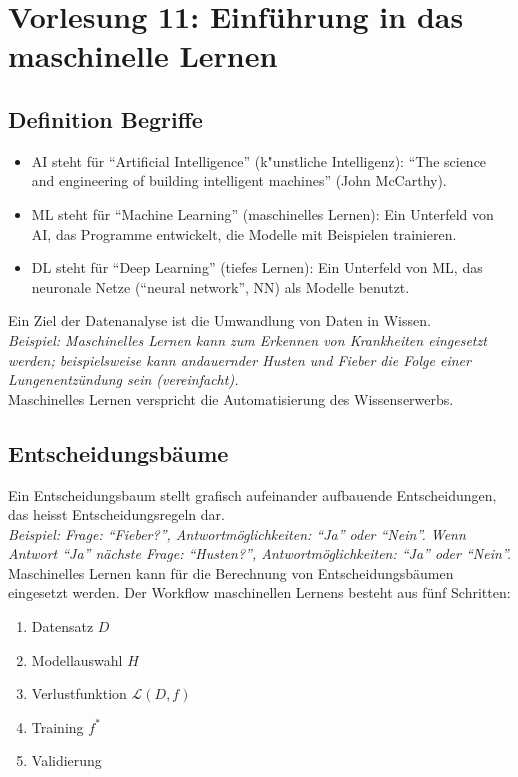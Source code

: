 \section{Vorlesung 11: Einf\"uhrung in das maschinelle Lernen}
\label{sec:vl11}


\subsection{Definition Begriffe}
\label{subsec:vl11}

\begin{itemize}
    \setlength\itemsep{0em}
        \item AI steht f\"ur ``Artificial Intelligence'' (k"unstliche Intelligenz): ``The science and engineering of building intelligent machines'' (John McCarthy).
        \item ML steht f\"ur ``Machine Learning'' (maschinelles Lernen): Ein Unterfeld von AI, das Programme entwickelt, die Modelle mit Beispielen trainieren.
        \item DL steht f\"ur ``Deep Learning'' (tiefes Lernen): Ein Unterfeld von ML, das neuronale Netze (``neural network'', NN) als Modelle benutzt.
\end{itemize}

Ein Ziel der Datenanalyse ist die Umwandlung von Daten in Wissen.\\[0.3cm]
\textit{Beispiel: Maschinelles Lernen kann zum Erkennen von Krankheiten eingesetzt werden; beispielsweise kann andauernder Husten und Fieber die Folge einer Lungenentz\"undung sein (vereinfacht).}\\[0.3cm]
Maschinelles Lernen verspricht die Automatisierung des Wissenserwerbs.


\subsection{Entscheidungsb\"aume}
\label{subsec:vl11-2}

Ein Entscheidungsbaum stellt grafisch aufeinander aufbauende Entscheidungen, das heisst Entscheidungsregeln dar.\\[0.3cm]
\textit{Beispiel: Frage: ``Fieber?'', Antwortm\"oglichkeiten: ``Ja'' oder ``Nein''. Wenn Antwort ``Ja'' n\"achste Frage: ``Husten?'', Antwortm\"oglichkeiten: ``Ja'' oder ``Nein''.}\\[0.3cm]
Maschinelles Lernen kann f\"ur die Berechnung von Entscheidungsb\"aumen eingesetzt werden. Der Workflow maschinellen Lernens besteht aus f\"unf Schritten:
\begin{enumerate}
    \setlength\itemsep{0em}
        \item Datensatz $D$
        \item Modellauswahl $H$
        \item Verlustfunktion $\mathcal{L}(D,f)$
        \item Training $f^*$
        \item Validierung
\end{enumerate}


